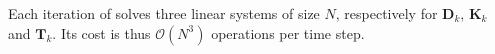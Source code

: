 \begin{remark}
	Each iteration of  solves three linear systems of size $N$, respectively for $\mathbf{D}_k$, $\mathbf{K}_k$ and $\mathbf{T}_k$. Its cost is thus $\mathcal{O}\left(N^3\right)$ operations per time step.
\end{remark}
